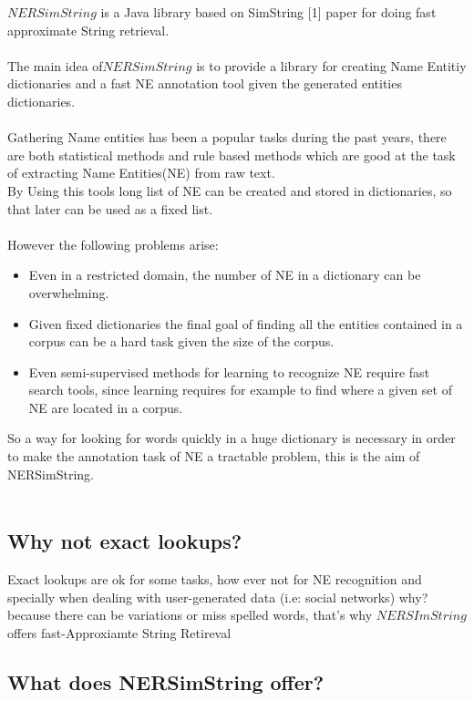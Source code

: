 

$NERSimString$ is a Java library based on SimString [1] paper for doing fast approximate String retrieval.\\
\\
The main idea of$ NERSimString$ is to provide a library for creating Name Entitiy dictionaries
and a fast NE annotation tool given the generated entities dictionaries.\\
\\
Gathering Name entities has been a popular tasks during the past years,
there are  both statistical methods and rule based methods which are good at the task of extracting Name Entities(NE) from raw text.\\
By Using this tools long list of NE can be created and stored in dictionaries, so that later can be used as a fixed list.\\
\\
However the following problems arise:
\begin{itemize}
	\item Even in a restricted domain, the number of NE in a dictionary can be overwhelming.
	\item Given fixed dictionaries the final goal of finding all the entities contained in a corpus can be a hard task given the size of the corpus. 
	\item Even semi-supervised methods for learning to recognize NE require fast search tools, since learning requires for example to find where a given set of NE are located in a corpus.
\end{itemize}

So a way for looking for words quickly in a huge dictionary is  necessary in order to make the annotation task of NE a tractable problem, this is the aim of NERSimString.\\
\\

\subsection*{Why not exact lookups?}
Exact lookups are ok for some tasks, how ever not for NE recognition and specially when dealing
with user-generated data (i.e: social networks) why? because there can be variations or miss spelled words,
that's why $NERSImString$ offers fast-Approxiamte String Retireval

\subsection*{What does NERSimString offer?}

